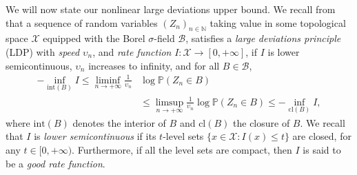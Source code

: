 \documentclass[aop,preprint]{imsart}
\newcommand\NN{\mathbb{N}}
\newcommand\PP{\mathbb{P}}
\numberwithin{equation}{section}
\theoremstyle{definition}
\theoremstyle{plain}
\theoremstyle{remark}
\begin{document}
We will now state our nonlinear large deviations upper bound.
We recall from \cite[Section 1.2]{DZ} that a sequence of random variables $(Z_n)_{n\in \NN}$ taking value in some topological space $\mathcal{X}$ equipped with the Borel $\sigma$-field $\mathcal{B}$, satisfies a \textit{large deviations principle} (LDP) with \textit{speed} $\upsilon_n$, and \textit{rate function} $I : \mathcal{X} \to [0, +\infty]$, if $I$ is lower semicontinuous, $\upsilon_n$ increases to infinity, and for all $B\in \mathcal{B}$,
\begin{align}
- \inf_{\mathrm{int}(B)}I \leq \liminf_{n\to +\infty} \frac{1}{\upsilon_n}& \log \PP\left(Z_n \in B\right)\nonumber\\
& \leq \limsup_{n\to +\infty} \frac{1}{\upsilon_n}\log\PP\left(Z_n \in B\right) 
\leq -\inf_{\mathrm{cl}(B)  } I,\label{upperboundLDP}\end{align}
where $\mathrm{int}(B)$ denotes the interior of $B$ and $\mathrm{cl}(B)$ the closure of $B$. We recall that $I$ is \textit{lower semicontinuous} if its $t$-level sets $\{ x \in \mathcal{X} : I(x) \leq t \}$ are closed, for any $t\in [0,+\infty)$. Furthermore, if all the level sets are compact, then $I$ is said to be a \textit{good rate function}.
\end{document}
